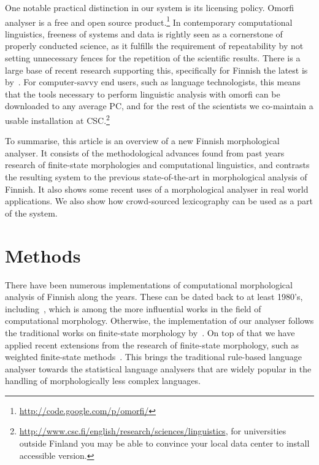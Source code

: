 \documentclass[a4paper,12pt]{article}
\begin{document}
One notable practical distinction in our system is its licensing policy. Omorfi
analyser is a free and open source product.\footnote{
\url{http://code.google.com/p/omorfi/}}  In contemporary computational
linguistics, freeness of systems and data is rightly seen as a cornerstone of
properly conducted science, as it fulfills the requirement of repeatability by
not setting unnecessary fences for the repetition of the scientific results.
There is a large base of recent research supporting this, specifically for
Finnish the latest is by~\citet{koskenniemi2008build}. For computer-savvy end
users, such as language technologists, this means that the tools necessary to
perform linguistic analysis with omorfi can be downloaded to any average PC,
and for the rest of the scientists we co-maintain a usable installation at
CSC.\footnote{\url{http://www.csc.fi/english/research/sciences/linguistics}, 
for universities outside Finland you may be able to convince your local data
center to install accessible version.}

To summarise, this article is an overview of a new Finnish morphological
analyser.  It consists of the methodological advances found from past years
research of finite-state morphologies and computational linguistics, and
contrasts the resulting system to the previous state-of-the-art in
morphological analysis of Finnish. It also shows some recent uses of a
morphological analyser in real world applications. We also show how
crowd-sourced lexicography can be used as a part of the system.

\section{Methods}
\label{sec:methods}

There have been numerous implementations of computational morphological
analysis of Finnish along the years. These  can be dated back to at least
1980's, including~\citet{koskenniemi1983twolevel}, which is among the more
influential works in the field of computational morphology. 
Otherwise, the implementation of our analyser
follows the traditional works on finite-state morphology
by~\citet{beesley2003finite}. On top of that we
have applied recent extensions from the research of finite-state morphology,
such as weighted finite-state methods~\citep{openfst,hfst2012}. This brings the
traditional rule-based language analyser towards the statistical language
analysers that are widely popular in the handling of morphologically less
complex languages.
\end{document}
